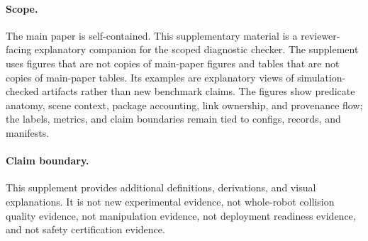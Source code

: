 \paragraph{Scope.}
The main paper is self-contained. This supplementary material is a reviewer-facing explanatory
companion for the scoped diagnostic checker. The supplement uses figures that are
not copies of main-paper figures and tables that are not copies of main-paper tables. Its examples
are explanatory views of simulation-checked artifacts rather than new benchmark claims. The figures
show predicate anatomy, scene context, package accounting, link ownership, and provenance
flow; the labels, metrics, and claim boundaries remain tied to configs, records, and manifests.

\paragraph{Claim boundary.}
This supplement provides additional definitions, derivations, and visual explanations. It is
not new experimental evidence, not whole-robot collision quality evidence, not manipulation evidence,
not deployment readiness evidence, and not safety certification evidence.
